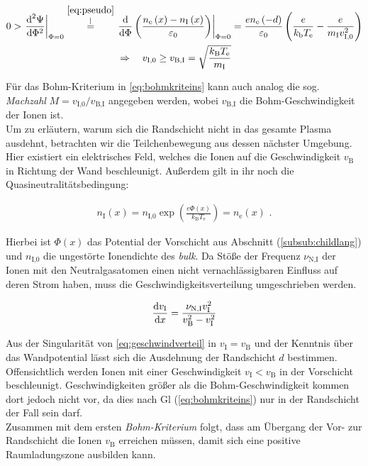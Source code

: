 \documentclass[numbers=noenddot,a4paper,notitlepage,twoside,BCOR15mm]{scrbook}
\newcommand{\diff}{\textnormal{d}}
\newcommand{\ix}[1]{_\text{#1}}
\newcommand{\tilt}[1]{\textit{#1}}
\begin{document}
				\begin{align}
					0>\left.\frac{\diff^{2}\Psi}{\diff\Phi^{2}}\right|_{\Phi=0}\overset{\autoref{eq:pseudo}}{\overset{\mid}{=}}\left.\frac{\diff}{\diff\Phi}\left(\frac{n\ix{e}\left(x\right)-n\ix{I}\left(x\right)}{\varepsilon\ix{0}}\right)\right|_{\Phi=0}&=\frac{en\ix{e}\left(-d\right)}{\varepsilon\ix{0}}\left(\frac{e}{k\ix{b}T\ix{e}}-\frac{e}{m\ix{I}v\ix{I,0}^{2}}\right) \label{eq:beding} \\
					\Rightarrow \quad v\ix{I,0}\ge v\ix{B,I}=\sqrt{\frac{k\ix{B}T\ix{e}}{m\ix{I}}}& \label{eq:bohmkriteins}
				\end{align}


			Für das Bohm-Kriterium in \autoref{eq:bohmkriteins} kann auch analog die sog. \tilt{Machzahl} $M=v\ix{I,0}/v\ix{B,I}$ angegeben werden, wobei $v\ix{B,I}$ die Bohm-Geschwindigkeit der Ionen ist.\\
			Um zu erläutern, warum sich die Randschicht nicht in das gesamte Plasma ausdehnt, betrachten wir die Teilchenbewegung aus dessen nächster Umgebung. Hier existiert ein elektrisches Feld, welches die Ionen auf die Geschwindigkeit $v\ix{B}$ in Richtung der Wand beschleunigt. Außerdem gilt in ihr noch die Quasineutralitätsbedingung:

				\begin{align}
					n\ix{I}\left(x\right)=n\ix{I,0}\exp\left(\frac{e\Phi\left(x\right)}{k\ix{B}T\ix{e}}\right)=n\ix{e}\left(x\right)\,\, . \label{eq:bohmquasineutral}
				\end{align}

			Hierbei ist $\Phi\left(x\right)$ das Potential der Vorschicht aus Abschnitt (\ref{subsub:childlang}) und $n\ix{I,0}$ die ungestörte Ionendichte des \tilt{bulk}. Da Stöße der Frequenz $\nu\ix{N,I}$ der Ionen mit den Neutralgasatomen einen nicht vernachlässigbaren Einfluss auf deren Strom haben, muss die Geschwindigkeitsverteilung umgeschrieben werden.

				\begin{align}
					\frac{\diff v\ix{I}}{\diff x}=\frac{\nu\ix{N,I}v\ix{I}^2}{v\ix{B}^2-v\ix{I}^2} \label{eq:geschwindverteil}
				\end{align}

			Aus der Singularität von \autoref{eq:geschwindverteil} in $v\ix{I}=v\ix{B}$ und der Kenntnis über das Wandpotential lässt sich die Ausdehnung der Randschicht $d$ bestimmen. Offensichtlich werden Ionen mit einer Geschwindigkeit $v\ix{I}<v\ix{B}$ in der Vorschicht beschleunigt. Geschwindigkeiten größer als die Bohm-Geschwindigkeit kommen dort jedoch nicht vor, da dies nach Gl (\ref{eq:bohmkriteins}) nur in der Randschicht der Fall sein darf. \\
			Zusammen mit dem ersten \tilt{Bohm-Kriterium} folgt, dass am Übergang der Vor- zur Randschicht die Ionen $v\ix{B}$ erreichen müssen, damit sich eine positive Raumladungszone ausbilden kann.
\end{document}
